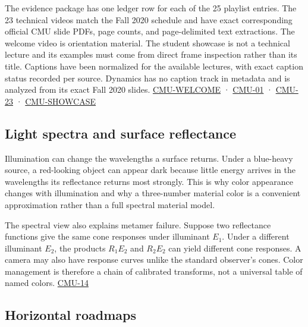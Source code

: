 The evidence package has one ledger row for each of the 25 playlist entries. The 23 technical videos match the Fall 2020 schedule and have exact corresponding official CMU slide PDFs, page counts, and page-delimited text extractions. The welcome video is orientation material. The student showcase is not a technical lecture and its examples must come from direct frame inspection rather than its title. Captions have been normalized for the available lectures, with exact caption status recorded per source. Dynamics has no caption track in metadata and is analyzed from its exact Fall 2020 slides. \hyperref[04-visual-computing-ii-ch036-cmu-welcome---course-welcome-and-learning-workflow]{CMU-WELCOME} · \hyperref[04-visual-computing-ii-ch036-cmu-01---course-overview]{CMU-01} · \hyperref[04-visual-computing-ii-ch036-cmu-23---physically-based-animation-and-pdes]{CMU-23} · \hyperref[04-visual-computing-ii-ch036-cmu-showcase---student-creations-and-project-outcomes]{CMU-SHOWCASE}

\subsection{Light spectra and surface reflectance}\label{04-visual-computing-ii-ch034-light-spectra-and-surface-reflectance}

\hypertarget{04-visual-computing-ii-ch034-light-spectra-and-surface-reflectance}{}

Illumination can change the wavelengths a surface returns. Under a blue-heavy source, a red-looking object can appear dark because little energy arrives in the wavelengths its reflectance returns most strongly. This is why color appearance changes with illumination and why a three-number material color is a convenient approximation rather than a full spectral material model.

The spectral view also explains metamer failure. Suppose two reflectance functions give the same cone responses under illuminant \(E_1\). Under a different illuminant \(E_2\), the products \(R_1E_2\) and \(R_2E_2\) can yield different cone responses. A camera may also have response curves unlike the standard observer's cones. Color management is therefore a chain of calibrated transforms, not a universal table of named colors. \hyperref[04-visual-computing-ii-ch036-cmu-14---color]{CMU-14}

\subsection{Horizontal roadmaps}\label{04-visual-computing-ii-ch034-horizontal-roadmaps}

